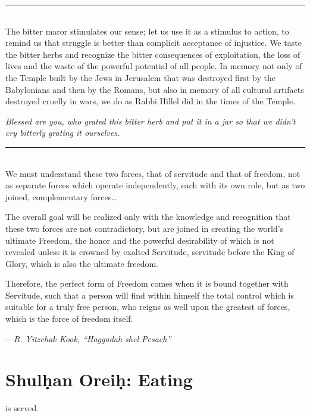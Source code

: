 \documentclass[letter,11pt,openany]{memoir}
\newcommand{\HgSource}[1]{\hfill{\small---\itshape{#1}}}
\newcommand{\HgFill}{
\vfill \hrule 
\vfill}
\newenvironment{HgEnglish}{\strut\\
\noindent}{\vspace{1em}}
\newcommand{\SSrc}{\textsuperscript{\upshape{[S]}}}
\begin{document}
\HgFill
\begin{HgEnglish}
	The bitter maror stimulates our sense; let us use it as a stimulus to action, to remind us that struggle is better than complicit acceptance of injustice. We taste the bitter herbs and recognize the bitter consequences of exploitation, the loss of lives and the waste of the powerful potential of all people. In memory not only of the Temple built by the Jews in Jerusalem that was destroyed first by the Babylonians and then by the Romans, but also in memory of all cultural artifacts destroyed cruelly in wars, we do as Rabbi Hillel did in the times of the Temple.
	
	{\itshape Blessed are you, who grated this bitter herb and put it in a jar so that we didn’t cry bitterly grating it ourselves.} \SSrc 
\end{HgEnglish}

\HgFill
\begin{HgEnglish}
	We must understand these two forces, that of servitude and that of freedom, not as separate forces which operate independently, each with its own role, but as two joined, complementary forces\ldots
	
	The overall goal will be realized only with the knowledge and recognition that these two forces are not contradictory, but are joined in creating the world’s ultimate Freedom, the honor and the powerful desirability of which is not revealed unless it is \linebreak crowned by exalted Servitude, servitude before the King of Glory, which is also the ultimate freedom.
	
	Therefore, the perfect form of Freedom comes when it is bound together with Servitude, such that a person will find within himself the total control which is suitable for a truly free person, who reigns as well upon the greatest of forces, which is the force of freedom itself.
	
	\HgSource{R. Yitzchak Kook, ``Haggadah shel Pesach''} 
\end{HgEnglish}

\chapter*{Shul\d{h}an Orei\d{h}: Eating} 
\vfill 
\begin{center}
	\fontsize{50pt}{50pt} \selectfont
	
	is served. 
\end{center}
\vfill
\end{document}
